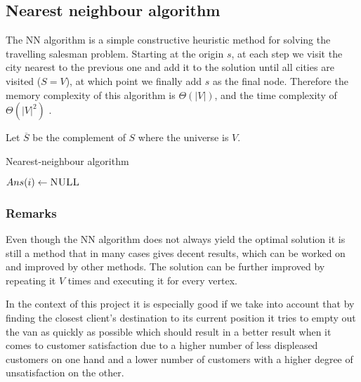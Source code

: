 \subsection{Nearest neighbour algorithm} \label{algorithm-tsp-nn}
The \acrfull*{NN} algorithm is a simple \gls{constructive} heuristic method for solving the travelling salesman problem.
Starting at the origin $s$, at each step we visit the city nearest to the previous one and add it to the solution until all cities are visited ($S = V$), at which point we finally add $s$ as the final node.
Therefore the memory complexity of this algorithm is $\Theta (|V|)$, and the time complexity of $\Theta (|V|^{2})$ \cite{reinelt}.\par
Let $\overline{S}$ be the complement of $S$ where the universe is $V$.
\begin{algorithm}[h]
    \caption{Nearest-neighbour algorithm}
    \label{alg:nearest neighbour}
    \begin{algorithmic}[1]
             {$Ans(i) \gets \textsc{NULL}$}
            \EndFor
            \EndFor
            \State {}
        \EndFunction
    \end{algorithmic}
\end{algorithm}
\subsubsection{Remarks}
Even though the \acrlong*{NN} algorithm does not always yield the optimal solution it is still a method that in many cases gives decent results, which can be worked on and improved by other methods.
The solution can be further improved by repeating it $V$ times and executing it for every vertex.\par
In the context of this project it is especially good if we take into account that by finding the closest client's destination to its current position it tries to empty out the van as quickly as possible
which should result in a better result when it comes to customer satisfaction due to a higher number of less displeased customers on one hand and a lower number of customers with a higher degree of unsatisfaction on the other.
\\
